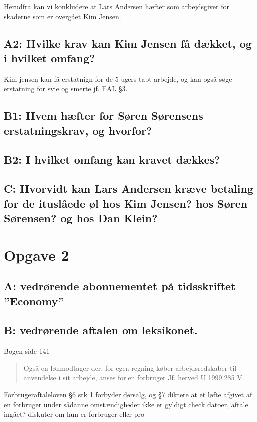 \documentclass[11pt, a4paper]{article}
\begin{document}
Herudfra kan vi konkludere at Lars Andersen hæfter som arbejdsgiver for skaderne
som er overgået Kim Jensen. 

\subsection*{A2: Hvilke krav kan Kim Jensen få dækket, og i hvilket omfang?}
Kim jensen kan få erstatnign for de 5 ugers tabt arbejde, og kan også søge
erstatning for svie og smerte jf. EAL §3.

\subsection*{B1: Hvem hæfter for Søren Sørensens erstatningskrav, og hvorfor?}

\subsection*{B2: I hvilket omfang kan kravet dækkes?}

\subsection*{C: Hvorvidt kan Lars Andersen kræve betaling for de ituslåede øl
hos Kim Jensen? hos Søren Sørensen? og hos Dan Klein?}

\section{Opgave 2}
\subsection*{A: vedrørende abonnementet på tidsskriftet ”Economy”}

\subsection*{B: vedrørende aftalen om leksikonet.}


Bogen side 141 \begin{quote}
Også en lønmodtager der, for egen regning køber
arbejdsredskaber til anvendelse i sit arbejde, anses for en forbruger Jf.
herved U 1999.285 V.
\end{quote}


Forbrugeraftaleloven §6 stk 1 forbyder dørsalg, og §7 diktere at et løfte
afgivet af en forbruger under sådanne omstændigheder ikke er gyldigt
check
datoer, aftale ingået? diskuter om hun er forbruger eller pro
\end{document}
